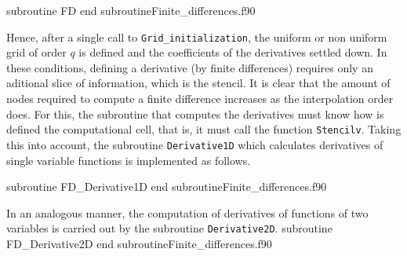     {subroutine FD}
    {end subroutine}{Finite_differences.f90}
    
    Hence, after a single call to \verb|Grid_initialization|, the uniform or non uniform grid of order $q$ is defined and the coefficients of 
    the derivatives settled down. In these conditions, defining a derivative (by finite differences) requires only an aditional slice of 
    information, which is the stencil. It is clear that the amount of nodes required to compute a finite difference increases as the 
    interpolation order does. For this, the subroutine that computes the derivatives must know how is defined the computational cell, that 
    is, it must call the function \verb|Stencilv|.
    Taking this into account, the subroutine \verb|Derivative1D| which calculates derivatives of single variable functions is implemented as 
    follows.
    
    \vspace{0.5cm} 
    {subroutine FD_Derivative1D}
    {end subroutine}{Finite_differences.f90}
    
    \newpage
    In an analogous manner, the computation of derivatives of functions of two variables is carried out by the subroutine 
    \verb|Derivative2D|.    
    \vspace{0.2cm} 
    {subroutine FD_Derivative2D}
    {end subroutine}{Finite_differences.f90}
    




